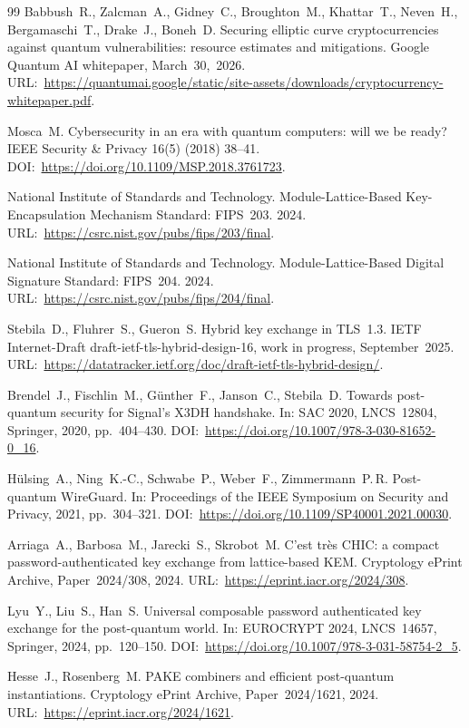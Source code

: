\documentclass[preprint,12pt]{elsarticle}
\theoremstyle{remark}
\begin{document}
\begin{thebibliography}{99}
Babbush~R., Zalcman~A., Gidney~C., Broughton~M., Khattar~T.,
Neven~H., Bergamaschi~T., Drake~J., Boneh~D.
Securing elliptic curve cryptocurrencies against quantum vulnerabilities:
resource estimates and mitigations.
Google Quantum AI whitepaper, March~30,~2026.
URL:~\url{https://quantumai.google/static/site-assets/downloads/cryptocurrency-whitepaper.pdf}.

Mosca~M.
Cybersecurity in an era with quantum computers: will we be ready?
IEEE Security \& Privacy 16(5) (2018) 38--41.
DOI:~\url{https://doi.org/10.1109/MSP.2018.3761723}.

National Institute of Standards and Technology.
Module-Lattice-Based Key-Encapsulation Mechanism Standard: FIPS~203.
2024.
URL:~\url{https://csrc.nist.gov/pubs/fips/203/final}.

National Institute of Standards and Technology.
Module-Lattice-Based Digital Signature Standard: FIPS~204.
2024.
URL:~\url{https://csrc.nist.gov/pubs/fips/204/final}.

Stebila~D., Fluhrer~S., Gueron~S.
Hybrid key exchange in TLS~1.3.
IETF Internet-Draft draft-ietf-tls-hybrid-design-16, work in progress, September~2025.
URL:~\url{https://datatracker.ietf.org/doc/draft-ietf-tls-hybrid-design/}.

Brendel~J., Fischlin~M., G\"{u}nther~F., Janson~C., Stebila~D.
Towards post-quantum security for Signal's X3DH handshake.
In: SAC 2020, LNCS~12804, Springer, 2020, pp.~404--430.
DOI:~\url{https://doi.org/10.1007/978-3-030-81652-0_16}.

H\"{u}lsing~A., Ning~K.-C., Schwabe~P., Weber~F., Zimmermann~P.\,R.
Post-quantum WireGuard.
In: Proceedings of the IEEE Symposium on Security and Privacy, 2021, pp.~304--321.
DOI:~\url{https://doi.org/10.1109/SP40001.2021.00030}.

Arriaga~A., Barbosa~M., Jarecki~S., Skrobot~M.
C'est tr\`es CHIC: a compact password-authenticated key exchange from lattice-based KEM.
Cryptology ePrint Archive, Paper~2024/308, 2024.
URL:~\url{https://eprint.iacr.org/2024/308}.

Lyu~Y., Liu~S., Han~S.
Universal composable password authenticated key exchange for the post-quantum world.
In: EUROCRYPT 2024, LNCS~14657, Springer, 2024, pp.~120--150.
DOI:~\url{https://doi.org/10.1007/978-3-031-58754-2_5}.

Hesse~J., Rosenberg~M.
PAKE combiners and efficient post-quantum instantiations.
Cryptology ePrint Archive, Paper~2024/1621, 2024.
URL:~\url{https://eprint.iacr.org/2024/1621}.


\end{thebibliography}
\end{document}
